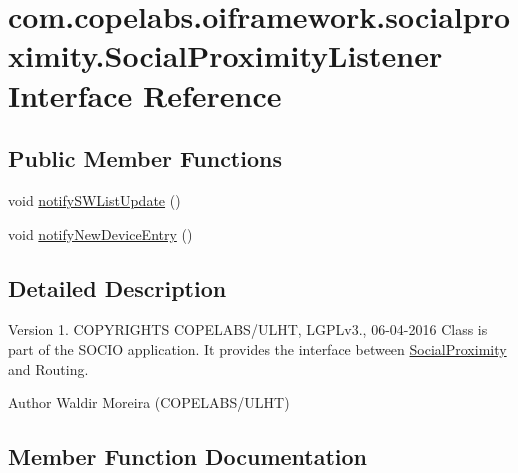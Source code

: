 \hypertarget{interfacecom_1_1copelabs_1_1oiframework_1_1socialproximity_1_1_social_proximity_listener}{}\section{com.\+copelabs.\+oiframework.\+socialproximity.\+Social\+Proximity\+Listener Interface Reference}
\label{interfacecom_1_1copelabs_1_1oiframework_1_1socialproximity_1_1_social_proximity_listener}
\subsection*{Public Member Functions}
\begin{DoxyCompactItemize}
\item 
void \hyperlink{interfacecom_1_1copelabs_1_1oiframework_1_1socialproximity_1_1_social_proximity_listener_a5ffdd5703699e42b550bffeac517b7ee}{notify\+S\+W\+List\+Update} ()
\item 
void \hyperlink{interfacecom_1_1copelabs_1_1oiframework_1_1socialproximity_1_1_social_proximity_listener_ab9aaf46f63eb4bb0df73ad93a03e9b4a}{notify\+New\+Device\+Entry} ()
\end{DoxyCompactItemize}


\subsection{Detailed Description}
\begin{DoxyVersion}{Version}
1. C\+O\+P\+Y\+R\+I\+G\+H\+T\+S C\+O\+P\+E\+L\+A\+B\+S/\+U\+L\+H\+T, L\+G\+P\+Lv3., 06-\/04-\/2016 Class is part of the S\+O\+C\+I\+O application. It provides the interface between \hyperlink{classcom_1_1copelabs_1_1oiframework_1_1socialproximity_1_1_social_proximity}{Social\+Proximity} and Routing. 
\end{DoxyVersion}
\begin{DoxyAuthor}{Author}
Waldir Moreira (C\+O\+P\+E\+L\+A\+B\+S/\+U\+L\+H\+T) 
\end{DoxyAuthor}


\subsection{Member Function Documentation}
\hypertarget{interfacecom_1_1copelabs_1_1oiframework_1_1socialproximity_1_1_social_proximity_listener_ab9aaf46f63eb4bb0df73ad93a03e9b4a}{}
